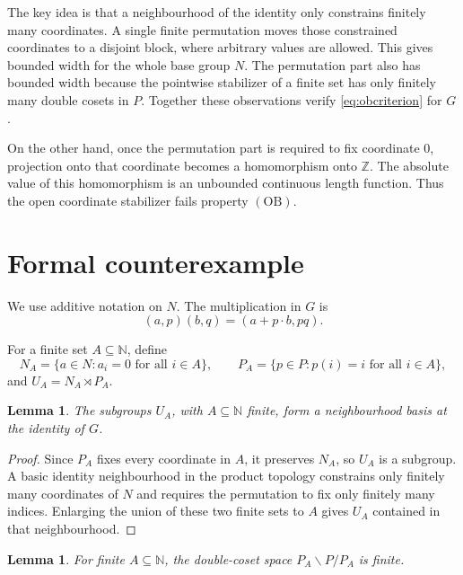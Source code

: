 \documentclass[11pt]{article}
\newtheorem{lemma}[theorem]{Lemma}
\newcommand{\N}{\mathbb N}
\newcommand{\Z}{\mathbb Z}
\newcommand{\OB}{\mathrm{OB}}
\begin{document}
The key idea is that a neighbourhood of the identity only constrains finitely
many coordinates.  A single finite permutation moves those constrained
coordinates to a disjoint block, where arbitrary values are allowed.  This
gives bounded width for the whole base group $N$.  The permutation part also
has bounded width because the pointwise stabilizer of a finite set has only
finitely many double cosets in $P$.  Together these observations verify
\eqref{eq:obcriterion} for $G$.

On the other hand, once the permutation part is required to fix coordinate
$0$, projection onto that coordinate becomes a homomorphism onto $\Z$.  The
absolute value of this homomorphism is an unbounded continuous length
function.  Thus the open coordinate stabilizer fails property $(\OB)$.

\section{Formal counterexample}

We use additive notation on $N$.  The multiplication in $G$ is
\[
 (a,p)(b,q)=(a+p\cdot b,pq).
\]

For a finite set $A\subseteq\N$, define
\[
 N_A=\{a\in N:a_i=0\text{ for all }i\in A\},\qquad
 P_A=\{p\in P:p(i)=i\text{ for all }i\in A\},
\]
and $U_A=N_A\rtimes P_A$.

\begin{lemma}\label{lem:basis}
The subgroups $U_A$, with $A\subseteq\N$ finite, form a neighbourhood basis
at the identity of $G$.
\end{lemma}

\begin{proof}
Since $P_A$ fixes every coordinate in $A$, it preserves $N_A$, so $U_A$ is a
subgroup.  A basic identity neighbourhood in the product topology constrains
only finitely many coordinates of $N$ and requires the permutation to fix
only finitely many indices.  Enlarging the union of these two finite sets to
$A$ gives $U_A$ contained in that neighbourhood.
\end{proof}

\begin{lemma}\label{lem:doublecosets}
For finite $A\subseteq\N$, the double-coset space $P_A\backslash P/P_A$ is
finite.
\end{lemma}
\end{document}

